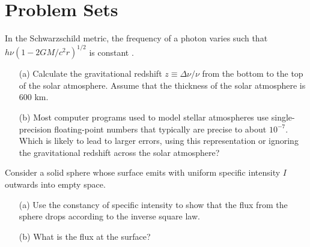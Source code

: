 
\chapter{Problem Sets}


\clearpage
\problemset

\begin{problem}
In the Schwarzschild metric, the frequency of a photon varies such that
$h\nu(1-2GM/c^2r)^{1/2}$ is constant \cite*[p.\ 187 and p.\ 659,
  although note that these authors set $G = c = 1$]{Misner-1973}.
\begin{enumerate}
\item[(a)]
Calculate the gravitational redshift $z \equiv \Delta\nu/\nu$ from the bottom to the top of the solar atmosphere. Assume that the thickness of the solar atmosphere is 600 km.
\item[(b)] Most computer programs used to model stellar atmospheres use
  single-precision floating-point numbers that typically are precise to
  about $10^{-7}$. Which is likely to lead to larger errors, using this
  representation or ignoring the gravitational redshift across the solar
  atmosphere?
\label{problem-gravitational-redshift}
\end{enumerate}
\end{problem}


\begin{problem}
Consider a solid sphere whose surface emits with uniform specific
intensity $I$ outwards into empty space. 
\begin{enumerate}
\item[(a)]
Use the constancy of specific
intensity to show that the flux from the sphere drops according to the
inverse square law. 
\item[(b)] What is the flux at the surface? 
\end{enumerate}

\end{problem}


